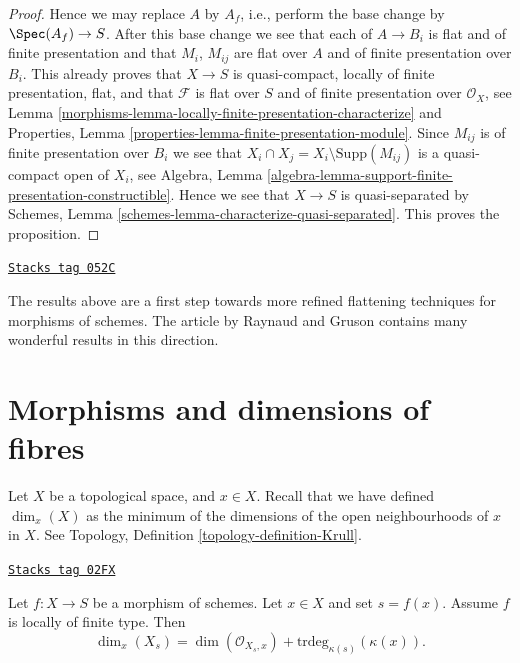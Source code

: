 \begin{proof}
\medskip\noindent
Hence we may replace $A$ by $A_f$, i.e.,
perform the base change by $\Spec(A_f) \to S$.
After this base change we see that each of $A \to B_i$ is
flat and of finite presentation and that $M_i$, $M_{ij}$ are flat over $A$
and of finite presentation over $B_i$.
This already proves that $X \to S$ is quasi-compact,
locally of finite presentation, flat, and that $\mathcal{F}$
is flat over $S$ and of finite presentation over $\mathcal{O}_X$, see
Lemma \ref{morphisms-lemma-locally-finite-presentation-characterize}
and
Properties, Lemma \ref{properties-lemma-finite-presentation-module}.
Since $M_{ij}$ is of finite presentation over $B_i$ we see that
$X_i \cap X_j = X_i \setminus \text{Supp}(M_{ij})$ is a quasi-compact
open of $X_i$, see
Algebra, Lemma \ref{algebra-lemma-support-finite-presentation-constructible}.
Hence we see that $X \to S$ is quasi-separated by
Schemes, Lemma \ref{schemes-lemma-characterize-quasi-separated}.
This proves the proposition.
\end{proof}


\begin{remark}[Flattening]
\label{morphisms-remark-flattening}
\href{https://stacks.math.columbia.edu/tag/052C}{\texttt{Stacks tag 052C}}

The results above are a first step towards more refined flattening techniques
for morphisms of schemes. The article \cite{GruRay} by Raynaud and Gruson
contains many wonderful results in this direction.
\end{remark}

\section{Morphisms and dimensions of fibres}
\label{morphisms-section-dimension-fibres}
Let $X$ be a topological space, and $x \in X$.
Recall that we have defined $\dim_x(X)$ as the minimum of the
dimensions of the open neighbourhoods of $x$ in $X$.
See Topology, Definition \ref{topology-definition-Krull}.

\begin{lemma}
\label{morphisms-lemma-dimension-fibre-at-a-point}
\href{https://stacks.math.columbia.edu/tag/02FX}{\texttt{Stacks tag 02FX}}

Let $f : X \to S$ be a morphism of schemes.
Let $x \in X$ and set $s = f(x)$.
Assume $f$ is locally of finite type.
Then
$$
\dim_x(X_s) =
\dim(\mathcal{O}_{X_s, x}) + \text{trdeg}_{\kappa(s)}(\kappa(x)).
$$
\end{lemma}

